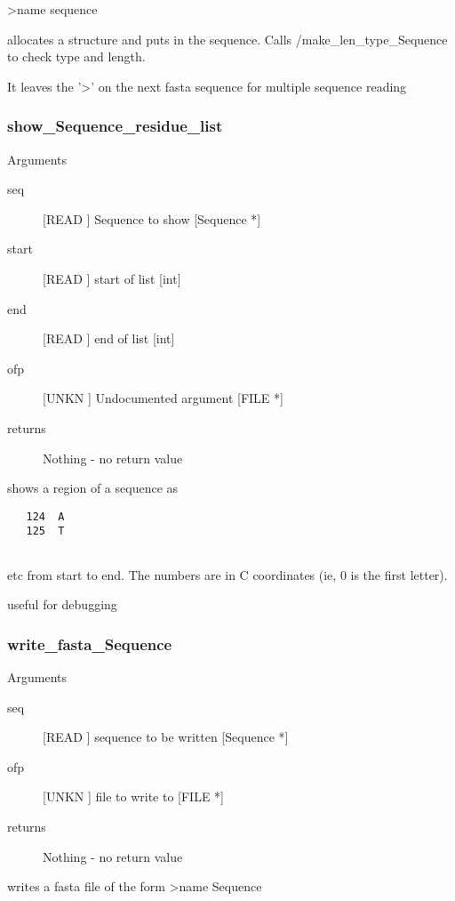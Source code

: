 >name
sequence


allocates a structure and puts in the
sequence. Calls /make_len_type_Sequence to
check type and length.


It leaves the '>' on the next fasta sequence
for multiple sequence reading


\subsubsection{show_Sequence_residue_list}

Arguments
\begin{description}
\item[seq] [READ ] Sequence to show [Sequence *]
\item[start] [READ ] start of list [int]
\item[end] [READ ] end of list [int]
\item[ofp] [UNKN ] Undocumented argument [FILE *]
\item[returns] Nothing - no return value
\end{description}
shows a region of a sequence as
\begin{verbatim}
   124  A
   125  T


\end{verbatim}
etc from start to end. The numbers
are in C coordinates (ie, 0 is the first
letter).


useful for debugging


\subsubsection{write_fasta_Sequence}

Arguments
\begin{description}
\item[seq] [READ ] sequence to be written [Sequence *]
\item[ofp] [UNKN ] file to write to [FILE *]
\item[returns] Nothing - no return value
\end{description}
writes a fasta file of the form
>name
Sequence


